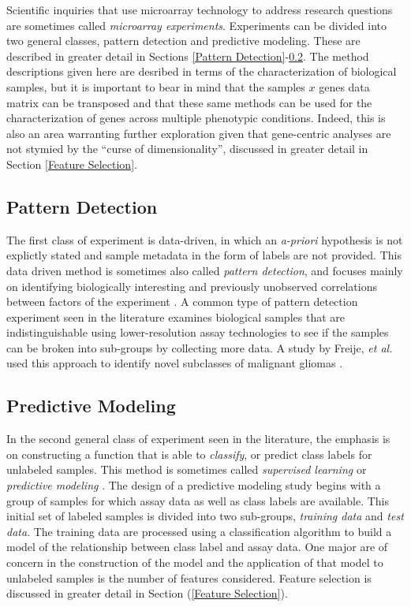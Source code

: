 Scientific inquiries that use microarray technology to address research
questions are sometimes called \emph{microarray experiments}.  Experiments can
be divided into two general classes, pattern detection and predictive modeling.
These are described in greater detail in Sections \ref{Pattern
Detection}-\ref{Predictive Modeling}.  The method descriptions given here are
desribed in terms of the characterization of biological samples, but it is
important to bear in mind that the samples $x$ genes data matrix can be
transposed and that these same methods can be used for the characterization of
genes across multiple phenotypic conditions.  Indeed, this is also an area
warranting further exploration given that gene-centric analyses are not stymied
by the ``curse of dimensionality'', discussed in greater detail in Section
\ref{Feature Selection}.

\subsection{Pattern Detection}
\label{Pattern Detection}

The first class of experiment is data-driven, in which an \emph{a-priori}
hypothesis is not explictly stated and sample metadata in the form of labels
are not provided.  This data driven method is sometimes also called
\emph{pattern detection}, and focuses mainly on identifying biologically
interesting and previously unobserved correlations between factors of the
experiment \cite{Dubitzky2003IMD}.  A common type of pattern detection
experiment seen in the literature examines biological samples that are
indistinguishable using lower-resolution assay technologies to see if the
samples can be broken into sub-groups by collecting more data.   A study by
Freije, \emph{et al.} used this approach to identify novel subclasses of
malignant gliomas \cite{PMID_15374961}.

\subsection{Predictive Modeling}
\label{Predictive Modeling}

In the second general class of experiment seen in the literature, the emphasis
is on constructing a function that is able to \emph{classify}, or predict class
labels for unlabeled samples.  This method is sometimes called \emph{supervised
learning} or \emph{predictive modeling} \cite{Dubitzky2003IMD}.  The design of
a predictive modeling study begins with a group of samples for which assay data
as well as class labels are available.  This initial set of labeled samples is
divided into two sub-groups, \emph{training data} and \emph{test data}.  The
training data are processed using a classification algorithm to build a model
of the relationship between class label and assay data.  One major are of
concern in the construction of the model and the application of that model to
unlabeled samples is the number of features considered.  Feature selection is
discussed in greater detail in Section (\ref{Feature Selection}).

